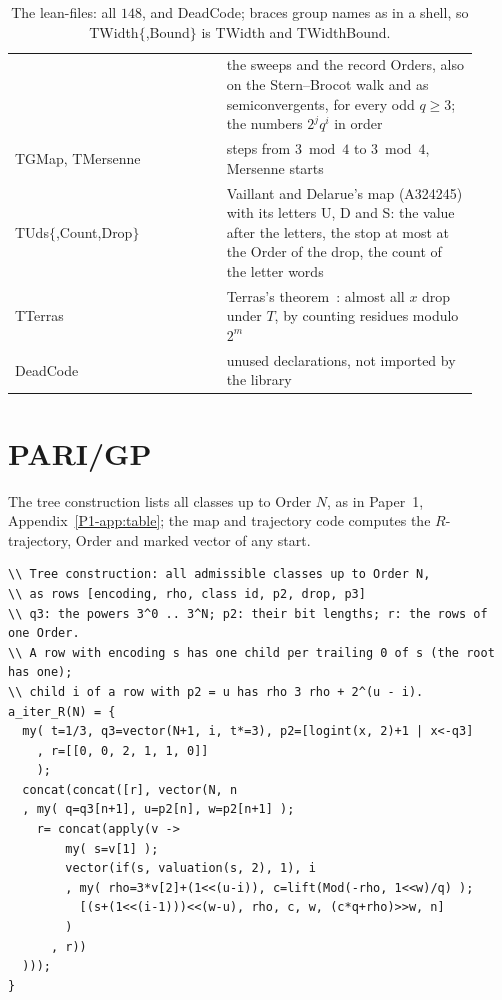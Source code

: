 \documentclass[10pt,a4paper,titlepage]{article}
\newcommand{\lean}[1]{\textsf{#1}}
\begin{document}
\begin{table}[p]
\begin{tabular}{@{}>{\raggedright\arraybackslash}p{0.42\linewidth}>{\raggedright\arraybackslash}p{0.5\linewidth}@{}}
  & the sweeps and the record Orders, also on the Stern--Brocot walk and as semiconvergents, for every odd $q \ge 3$; the numbers $2^j q^i$ in order \\
\lean{TGMap}, \lean{TMersenne}
  & steps from $3 \bmod 4$ to $3 \bmod 4$, Mersenne starts \\
\lean{TUds$\{$,Count,Drop$\}$}
  & Vaillant and Delarue's map (A324245) with its letters U, D and S: the value after the letters, the stop at most at the Order of the drop, the count of the letter words \\
\lean{TTerras}
  & Terras's theorem~\cite{Terras1976}: almost all $x$ drop under $T$, by counting residues modulo $2^m$ \\
\lean{DeadCode}
  & unused declarations, not imported by the library \\
\bottomrule
\end{tabular}
\caption{The lean-files: all $148$, and \lean{DeadCode}; braces group names as in a shell, so \lean{TWidth$\{$,Bound$\}$} is \lean{TWidth} and \lean{TWidthBound}.}
\label{tab:lean}
\end{table}

\section{PARI/GP}
\label{app:pari}

The tree construction lists all classes up to Order $N$, as in
Paper~1, Appendix~\ref{P1-app:table}; the map and trajectory code computes the $R$-trajectory,
Order and marked vector of any start.

\begin{lstlisting}[basicstyle=\ttfamily\scriptsize, breaklines=true]
\\ Tree construction: all admissible classes up to Order N,
\\ as rows [encoding, rho, class id, p2, drop, p3]
\\ q3: the powers 3^0 .. 3^N; p2: their bit lengths; r: the rows of one Order.
\\ A row with encoding s has one child per trailing 0 of s (the root has one);
\\ child i of a row with p2 = u has rho 3 rho + 2^(u - i).
a_iter_R(N) = {
  my( t=1/3, q3=vector(N+1, i, t*=3), p2=[logint(x, 2)+1 | x<-q3]
    , r=[[0, 0, 2, 1, 1, 0]]
    );
  concat(concat([r], vector(N, n
  , my( q=q3[n+1], u=p2[n], w=p2[n+1] );
    r= concat(apply(v ->
        my( s=v[1] );
        vector(if(s, valuation(s, 2), 1), i
        , my( rho=3*v[2]+(1<<(u-i)), c=lift(Mod(-rho, 1<<w)/q) );
          [(s+(1<<(i-1)))<<(w-u), rho, c, w, (c*q+rho)>>w, n]
        )
      , r))
  )));
}
\end{lstlisting}
\end{document}
